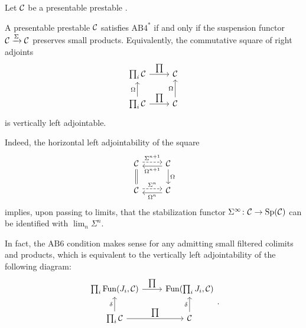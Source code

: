\documentclass[a4paper,10pt, oneside]{amsart}
\begin{document}
	\begin{de}\label{def:AB}
		
		Let $\mathcal{C}$ be a presentable prestable \infcat. 
		
	\end{de}
\begin{rem}\label{ab4staradjointable}
	A presentable prestable \infcat $\mathcal{C}$ satisfies $\mathrm{AB4}^*$ if and only if the suspension functor $\mathcal{C} \xrightarrow{\Sigma} \mathcal{C}$ preserves small products. Equivalently, the commutative square of right adjoints
	$$\begin{tikzcd}
		\prod_i \mcc \arrow[r, "\prod"] & \mcc \\
		\prod_i \mcc \arrow[u, "\Omega"] \arrow[r, "\prod"] & \mcc \arrow[u, "\Omega"]
	\end{tikzcd}$$
	is vertically left adjointable.
	
	Indeed, the horizontal left adjointability of the square
	$$\begin{tikzcd}
		\mcc \arrow[d, Rightarrow, no head] \arrow[r, "\Sigma^{n+1}", dashed, shift left] & \mcc \arrow[l, "\Omega^{n+1}", shift left] \arrow[d, "\Omega"] \\
		\mcc \arrow[r, "\Sigma^{n}", dashed, shift left] & \mcc \arrow[l, "\Omega^n", shift left]
	\end{tikzcd}$$
	implies, upon passing to limits, that the stabilization functor $\Sigma^\infty \colon \mathcal{C} \to \mathrm{Sp}(\mathcal{C})$ can be identified with $\lim_n \Sigma^n$.
\end{rem}
	\begin{rem}\label{ab6adjointable}
		In fact, the $\mathrm{AB6}$ condition makes sense for any \infcat admitting small filtered colimits and products, which is equivalent to the vertically left adjointability of the following diagram:
		$$\begin{tikzcd}
			{\prod_i \funct(J_i,\mcc)} \arrow[r, "\prod"]    & {\funct(\prod_i J_i,\mcc)} \\
			\prod_i \mcc \arrow[u, "\delta"] \arrow[r, "\prod"] & \mcc \arrow[u, "\delta"]
		\end{tikzcd} .$$

	\end{rem}
\end{document}
